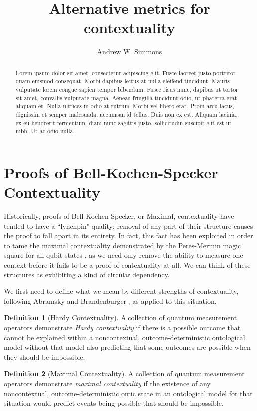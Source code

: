 \documentclass{amsart}
\theoremstyle{definition}
\newtheorem{defn}{Definition}
\begin{document}
\title{Alternative metrics for contextuality}
\author{Andrew W. Simmons}
\address{Department of Physics, Imperial College London, SW7 2AZ.}
\begin{abstract}
Lorem ipsum dolor sit amet, consectetur adipiscing elit. Fusce laoreet justo porttitor quam euismod consequat. Morbi dapibus lectus at nulla eleifend tincidunt. Mauris vulputate lorem congue sapien tempor bibendum. Fusce risus nunc, dapibus ut tortor sit amet, convallis vulputate magna. Aenean fringilla tincidunt odio, ut pharetra erat aliquam et. Nulla ultrices in odio at rutrum. Morbi vel libero erat. Proin arcu lacus, dignissim et semper malesuada, accumsan id tellus. Duis non ex est. Aliquam lacinia, ex eu hendrerit fermentum, diam nunc sagittis justo, sollicitudin suscipit elit est ut nibh. Ut ac odio nulla.
\end{abstract}
\maketitle
\section{Proofs of Bell-Kochen-Specker Contextuality}

Historically, proofs of Bell-Kochen-Specker, or Maximal, contextuality have tended to have a ``lynchpin" quality; removal of any part of their structure causes the proof to fall apart in its entirety.  In fact, this fact has been exploited in order to tame the maximal contextuality demonstrated by the Peres-Mermin magic square for all qubit states \cite{Berm2016}, as we need only remove the ability to measure one context before it fails to be a proof of contextuality at all. We can think of these structures as exhibiting a kind of circular dependency.

We first need to define what we mean by different strengths of contextuality, following Abramsky and Brandenburger \cite{Abra2011}, as applied to this situation.

\begin{defn}[Hardy Contextuality]
A collection of quantum measurement operators demonstrate \emph{Hardy contextuality} if there is a possible outcome that cannot be explained within a noncontextual, outcome-deterministic ontological model without that model also predicting that some outcomes are possible when they should be impossible.
\end{defn}

\begin{defn}[Maximal Contextuality]
A collection of quantum measurement operators demonstrate \emph{maximal contextuality} if the existence of any noncontextual, outcome-deterministic ontic state in an ontological model for that situation would predict events being possible that should be impossible. %
\end{defn}
\end{document}
